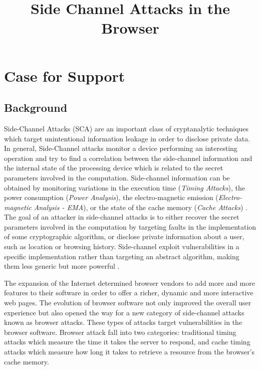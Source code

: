 \documentclass[a4paper,11pt]{article}
\title{Side Channel Attacks in the Browser}
\date{}
\begin{document}
\maketitle

\section*{Case for Support}


\subsection*{Background}
Side-Channel Attacks (SCA) are an important class of cryptanalytic techniques which target unintentional information leakage in order to disclose private data. In general, Side-Channel attacks monitor a device performing an interesting operation and try to find a correlation between the side-channel information and the internal state of the processing device which is related to the secret parameters involved in the computation. Side-channel information can be obtained by monitoring variations in the execution time (\textit{Timing Attacks}), the power consumption (\textit{Power Analysis}), the electro-magnetic emission (\textit{Electro-magnetic Analysis - EMA}), or the state of the cache memory (\textit{Cache Attacks}) \cite{standaert2010introduction}. The goal of an attacker in side-channel attacks is to either recover the secret parameters involved in the computation by targeting faults in the implementation of some cryptographic algorithm, or disclose private information about a user, such as location or browsing history. Side-channel exploit vulnerabilities in a specific implementation rather than targeting an abstract algorithm, making them less generic but more powerful \cite{standaert2010introduction}.

The expansion of the Internet determined browser vendors to add more and more features to their software in order to offer a richer, dynamic and more interactive web pages. The evolution of browser software not only improved the overall user experience but also opened the way for a new category of side-channel attacks known as browser attacks. These types of attacks target vulnerabilities in the browser software. Browser attack fall into two categories: traditional timing attacks which measure the time it takes the server to respond, and cache timing attacks which measure how long it takes to retrieve a resource from the browser's cache memory.
\end{document}
